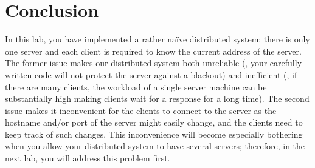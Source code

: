 \documentclass[a4paper]{article}
\begin{document}
\section{Conclusion}
In this lab, you have implemented a rather na\"{i}ve distributed system: there
is only one server and each client is required to know the current address of
the server. The former issue makes our distributed system both unreliable (\eg,
your carefully written code will not protect the server against a blackout) and
inefficient (\eg, if there are many clients, the workload of a single server
machine can be substantially high making clients wait for a response for a long
time). The second issue makes it inconvenient for the clients to connect to the
server as the hostname and/or port of the server might easily change, and the
clients need to keep track of such changes. This inconvenience will become
especially bothering when you allow your distributed system to have several
servers; therefore, in the next lab, you will address this problem first.

\printbibliography
\end{document}
